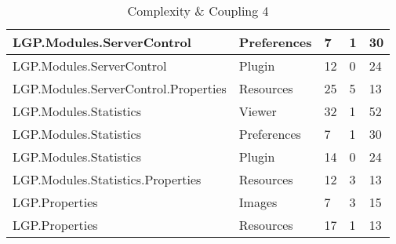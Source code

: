 \begin{table}[h!t]
{\begin{tabular}{ | p{82mm} | p{32mm} | p{10mm} | p{10mm} | p{10mm} | }
				LGP.Modules.ServerControl & Preferences & 7     & 1     & 30  \\ \hline
				LGP.Modules.ServerControl & Plugin & 12    & 0     & 24  \\ \hline
				LGP.Modules.ServerControl.Properties & Resources & 25    & 5     & 13  \\ \hline
				LGP.Modules.Statistics & Viewer & 32    & 1     & \cellcolor{ored}52  \\ \hline
				LGP.Modules.Statistics & Preferences & 7     & 1     & 30  \\ \hline
				LGP.Modules.Statistics & Plugin & 14    & 0     & 24  \\ \hline
				LGP.Modules.Statistics.Properties & Resources & 12    & 3     & 13  \\ \hline
				LGP.Properties & Images & 7     & 3     & 15  \\ \hline
				LGP.Properties & Resources & 17    & 1     & 13  \\ \hline
				\end{tabular}}
				
				\caption{Complexity \& Coupling 4}			
				\label{tab:ComplexityCoupling4}
				
			\end{table}
